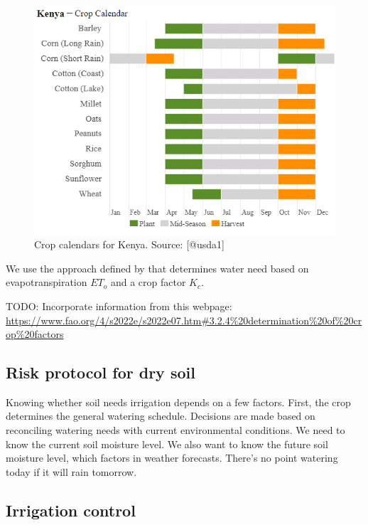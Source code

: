 \documentclass[
]{book}
\begin{document}
\begin{figure}

{\centering \includegraphics[width=8.33in]{images/eafrica_ke_calendar} 

}

\caption{Crop calendars for Kenya. Source: [@usda1]}\label{fig:unnamed-chunk-5}
\end{figure}

We use the approach defined by \citet{brouwer1986} that determines water need
based on evapotranspiration \(ET_o\) and a crop factor \(K_c\).

TODO: Incorporate information from this webpage:
\url{https://www.fao.org/4/s2022e/s2022e07.htm\#3.2.4\%20determination\%20of\%20crop\%20factors}

\hypertarget{risk-protocol-for-dry-soil}{%
\subsection{Risk protocol for dry soil}\label{risk-protocol-for-dry-soil}}

Knowing whether soil needs irrigation depends on a few factors. First, the crop determines the general watering schedule. Decisions are made based on reconciling watering needs with current environmental conditions. We need to know the current soil moisture level. We also want to know the future soil moisture level, which factors in weather forecasts. There's no point watering today if it will rain tomorrow.

\hypertarget{irrigation-control}{%
\subsection{Irrigation control}\label{irrigation-control}}
\end{document}

